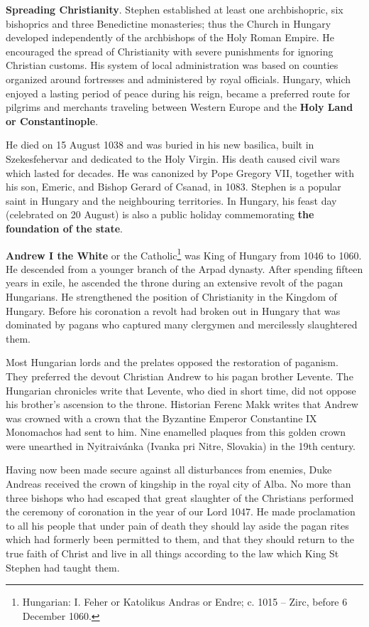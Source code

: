 \textbf{Spreading Christianity}. Stephen established at least one archbishopric, six bishoprics and three Benedictine monasteries; thus the Church in Hungary developed independently of the archbishops of the Holy Roman Empire. He encouraged the spread of Christianity with severe punishments for ignoring Christian customs. His system of local administration was based on counties organized around fortresses and administered by royal officials. Hungary, which enjoyed a lasting period of peace during his reign, became a preferred route for pilgrims and merchants traveling between Western Europe and the \textbf{Holy Land or Constantinople}.

He died on 15 August 1038 and was buried in his new basilica, built in Szekesfehervar and dedicated to the Holy Virgin. His death caused civil wars which lasted for decades. He was canonized by Pope Gregory VII, together with his son, Emeric, and Bishop Gerard of Csanad, in 1083. Stephen is a popular saint in Hungary and the neighbouring territories. In Hungary, his feast day (celebrated on 20 August) is also a public holiday commemorating \textbf{the foundation of the state}.

\textbf{Andrew I the White} or the Catholic\footnote{Hungarian: I. Feher or Katolikus Andras or Endre; c. 1015 -- Zirc, before 6 December 1060.} was King of Hungary from 1046 to 1060. He descended from a younger branch of the Arpad dynasty. After spending fifteen years in exile, he ascended the throne during an extensive revolt of the pagan Hungarians. He strengthened the position of Christianity in the Kingdom of Hungary. Before his coronation a revolt had broken out in Hungary that was dominated by pagans who captured many clergymen and mercilessly slaughtered them.

Most Hungarian lords and the prelates opposed the restoration of paganism. They preferred the devout Christian Andrew to his pagan brother Levente. The Hungarian chronicles write that Levente, who died in short time, did not oppose his brother's ascension to the throne. Historian Ferenc Makk writes that Andrew was crowned with a crown that the Byzantine Emperor Constantine IX Monomachos had sent to him. Nine enamelled plaques from this golden crown were unearthed in Nyitraivánka (Ivanka pri Nitre, Slovakia) in the 19th century.

\begin{quotex}
Having now been made secure against all disturbances from enemies, Duke Andreas received the crown of kingship in the royal city of Alba. No more than three bishops who had escaped that great slaughter of the Christians performed the ceremony of coronation in the year of our Lord 1047. He made proclamation to all his people that under pain of death they should lay aside the pagan rites which had formerly been permitted to them, and that they should return to the true faith of Christ and live in all things according to the law which King St Stephen had taught them.
\end{quotex}


